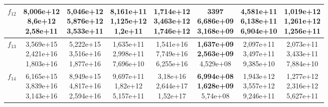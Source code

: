 \begin{table}[t]
\begin{small}
\begin{tabular}{|c|c|c|c|c|c|c|c|}
        $f_{12}$ & \makecell{8,006e+12 \\ 8,6e+12 \\ 2,58e+11}    & \makecell{5,046e+12 \\ 5,876e+12 \\ 3,533e+11} & \makecell{8,161e+11 \\ 1,125e+12 \\ 1,2e+11}   & \makecell{1,714e+12 \\ 3,463e+12 \\ 1,746e+12} & \makecell{\textbf{3397} \\ \textbf{6,686e+09} \\ 3,168e+09}      & \makecell{4,581e+11 \\ 6,138e+11 \\ 6,904e+10} & \makecell{1,019e+12 \\ 1,261e+12 \\ 1,256e+11} \\\hline
        $f_{13}$ & \makecell{3,569e+15 \\ 2,421e+16 \\ 1,803e+16} & \makecell{5,222e+15 \\ 3,516e+16 \\ 1,877e+16} & \makecell{1,635e+11 \\ 2,998e+11 \\ 7,696e+10} & \makecell{1,541e+16 \\ 7,749e+16 \\ 6,255e+16} & \makecell{\textbf{1,637e+09} \\ \textbf{2,563e+09} \\ 4,529e+08} & \makecell{2,097e+11 \\ 3,497e+11 \\ 9,385e+10} & \makecell{2,073e+11 \\ 3,433e+11 \\ 7,884e+10} \\\hline
        $f_{14}$ & \makecell{6,165e+15 \\ 3,839e+16 \\ 3,143e+16} & \makecell{8,949e+15 \\ 4,817e+16 \\ 2,594e+16} & \makecell{9,697e+11 \\ 1,82e+12 \\ 5,157e+11}  & \makecell{3,18e+16 \\ 2,644e+17 \\ 1,52e+17}  & \makecell{\textbf{6,994e+08} \\ \textbf{1,628e+09} \\ 5,74e+08}  & \makecell{1,943e+12 \\ 3,557e+12 \\ 9,246e+11} & \makecell{1,277e+12 \\ 2,316e+12 \\ 5,627e+11} \\\hline

\end{tabular}
\end{small}
\end{table}
